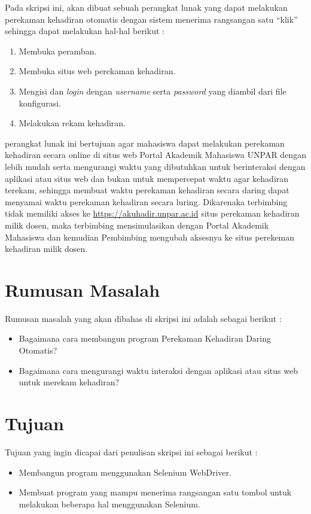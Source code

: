\documentclass[a4paper,twoside]{article}
\begin{document}
Pada skripsi ini, akan dibuat sebuah perangkat lunak yang dapat melakukan perekaman kehadiran otomatis dengan sistem menerima rangsangan satu ``klik'' sehingga dapat melakukan hal-hal berikut :
\begin{enumerate}
	\item Membuka peramban.
	\item Membuka situs web perekaman kehadiran.
	\item Mengisi dan \textit{login} dengan \textit{username} serta \textit{password} yang diambil dari file konfigurasi.
	\item Melakukan rekam kehadiran.
\end{enumerate} 
perangkat lunak ini bertujuan agar mahasiswa dapat melakukan perekaman kehadiran secara online di situs web Portal Akademik Mahasiswa UNPAR dengan lebih mudah serta mengurangi waktu yang dibutuhkan untuk berinteraksi dengan aplikasi atau situs web dan bukan untuk mempercepat waktu agar kehadiran terekam, sehingga membuat waktu perekaman kehadiran secara daring dapat menyamai waktu perekaman kehadiran secara luring. Dikarenaka terbimbing tidak memiliki akses ke \url{https://akuhadir.unpar.ac.id} situs perekaman kehadiran milik dosen, maka terbimbing mensimulasikan dengan Portal Akademik Mahasiswa dan kemudian Pembimbing mengubah aksesnya ke situs perekeman kehadiran milik dosen.

\section{Rumusan Masalah}
Rumusan masalah yang akan dibahas di skripsi ini adalah sebagai berikut :
\begin{itemize}
	\item Bagaimana cara membangun program Perekaman Kehadiran Daring Otomatis?
	\item Bagaimana cara mengurangi waktu interaksi dengan aplikasi atau situs web untuk merekam kehadiran?
\end{itemize}

\section{Tujuan}
Tujuan yang ingin dicapai dari penulisan skripsi ini sebagai berikut :
\begin{itemize}
	\item Membangun program menggunakan Selenium WebDriver.
	\item Membuat program yang mampu menerima rangsangan satu tombol untuk melakukan beberapa hal menggunakan Selenium.
\end{itemize}
\end{document}
